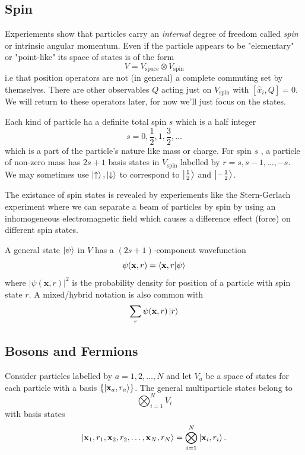 \documentclass{article}
\begin{document}
\subsection{Spin}
Experiements show that particles carry an \textit{internal} degree of freedom called \textit{spin} or intrinsic angular momentum. Even if the particle appears to be "elementary" or "point-like" its space of states is of the form
\[
	V = V_{\mathrm{space}} \otimes V_{\mathrm {spin}}
\]
i.e that position operators are not (in general) a complete commuting set by themselves. There are other observables $ Q $ acting just on $ V_{\mathrm{spin}} $ with $ [\hat x_i,Q] = 0 $. We will return to these operators later, for now we'll just focus on the states.\par
Each kind of particle ha a definite total spin $ s $ which is a half integer 
\[
  s = 0,\frac 12, 1, \frac 32, \dots
\]
which is a part of the particle's nature like mass or charge. For spin $ s $ , a particle of non-zero mass has $ 2s+1 $ basis states in $ V_{\mathrm{spin}} $ labelled by $ r= s,s-1,\dots, -s $. We may sometimes use $ \ket \uparrow, \ket \downarrow $ to correspond to $ \ket{\frac 12} $ and $ \ket{-\frac 12} $.\par
The existance of spin states is revealed by experiements like the Stern-Gerlach experiment where we can separate a beam of particles by spin by using an inhomogeneous electromagnetic field which causes a difference effect (force) on different spin states.
\par
A general state $ \ket\psi $ in $ V $ has a $ (2s+1) $-component wavefunction
\[
	\psi(\mathbf x,r) = \bra{\mathbf x,r}\ket{\psi}
\]
where $ |\psi(\mathbf x,r)|^2 $ is the probability density for position of a particle with spin state $ r $. A mixed/hybrid notation is also common with
\[
  \sum_r \psi(\mathbf x,r)\ket r
\]
\subsection{Bosons and Fermions}
Consider particles labelled by $ a=1,2,\dots, N $ and let $ V_a $ be a space of states for each particle with a basis $ \{\ket{\mathbf x_a,r_a}\} $. The general multiparticle states belong to
\[
	\bigotimes_{i=1}^N V_i
\]
with basis states 
\[
	\ket{\mathbf{x}_1,r_1,\mathbf{x}_2,r_2,\dots, \mathbf{x}_N,r_N} = \bigotimes_{i=1}^N \ket{\mathbf{x}_i,r_i}.
\]
\end{document}
